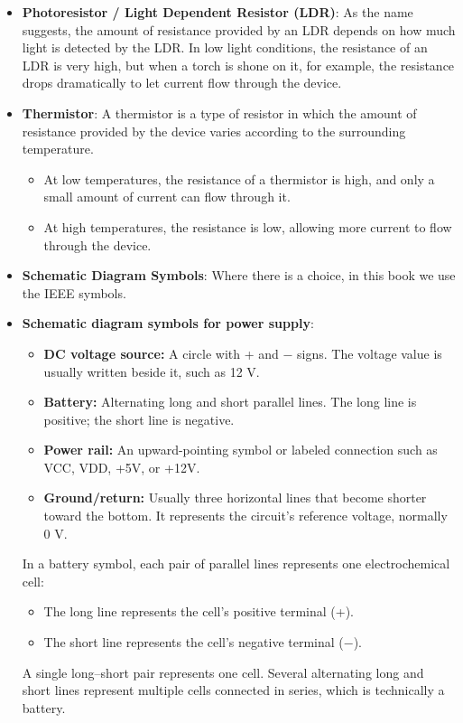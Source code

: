 \documentclass{report}
\begin{document}
\begin{itemize}
            \bigbreak \noindent 
            Logarithmic scales are typically used to control the volume on audio devices.
            \bigbreak \noindent 
        \item \textbf{Photoresistor / Light Dependent Resistor (LDR)}: As the name suggests, the amount of resistance provided by an LDR depends on how much light is detected by the LDR. In low light conditions, the resistance of an LDR is very high, but when a torch is shone on it, for example, the resistance drops dramatically to let current flow through the device.
        \item \textbf{Thermistor}: A thermistor is a type of resistor in which the amount of resistance provided by the device varies according to the surrounding temperature.
            \begin{itemize}
                \item At low temperatures, the resistance of a thermistor is high, and only a small amount of current can flow through it.
                \item At high temperatures, the resistance is low, allowing more current to flow through the device.
            \end{itemize}
        \item \textbf{Schematic Diagram Symbols}: 
            \bigbreak \noindent 
            \bigbreak \noindent 
            Where there is a choice, in this book we use the IEEE symbols.
        \item \textbf{Schematic diagram symbols for power supply}: 
            \begin{itemize}
                \item \textbf{DC voltage source:} A circle with + and − signs. The voltage value is usually written beside it, such as 12 V.
                \item \textbf{Battery:} Alternating long and short parallel lines. The long line is positive; the short line is negative.
                \item \textbf{Power rail:} An upward-pointing symbol or labeled connection such as VCC, VDD, +5V, or +12V.
                \item \textbf{Ground/return:} Usually three horizontal lines that become shorter toward the bottom. It represents the circuit’s reference voltage, normally 0 V.
            \end{itemize}
            In a battery symbol, each pair of parallel lines represents one electrochemical cell:
            \begin{itemize}
                \item The long line represents the cell’s positive terminal (+).
                \item The short line represents the cell’s negative terminal (−).
            \end{itemize}
            A single long–short pair represents one cell. Several alternating long and short lines represent multiple cells connected in series, which is technically a battery.


    \end{itemize}
\end{document}
